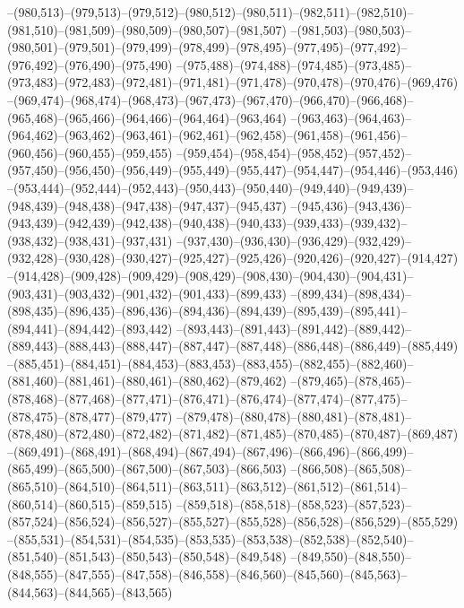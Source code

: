 --(980,513)--(979,513)--(979,512)--(980,512)--(980,511)--(982,511)--(982,510)--(981,510)--(981,509)--(980,509)--(980,507)--(981,507)
--(981,503)--(980,503)--(980,501)--(979,501)--(979,499)--(978,499)--(978,495)--(977,495)--(977,492)--(976,492)--(976,490)--(975,490)
--(975,488)--(974,488)--(974,485)--(973,485)--(973,483)--(972,483)--(972,481)--(971,481)--(971,478)--(970,478)--(970,476)--(969,476)
--(969,474)--(968,474)--(968,473)--(967,473)--(967,470)--(966,470)--(966,468)--(965,468)--(965,466)--(964,466)--(964,464)--(963,464)
--(963,463)--(964,463)--(964,462)--(963,462)--(963,461)--(962,461)--(962,458)--(961,458)--(961,456)--(960,456)--(960,455)--(959,455)
--(959,454)--(958,454)--(958,452)--(957,452)--(957,450)--(956,450)--(956,449)--(955,449)--(955,447)--(954,447)--(954,446)--(953,446)
--(953,444)--(952,444)--(952,443)--(950,443)--(950,440)--(949,440)--(949,439)--(948,439)--(948,438)--(947,438)--(947,437)--(945,437)
--(945,436)--(943,436)--(943,439)--(942,439)--(942,438)--(940,438)--(940,433)--(939,433)--(939,432)--(938,432)--(938,431)--(937,431)
--(937,430)--(936,430)--(936,429)--(932,429)--(932,428)--(930,428)--(930,427)--(925,427)--(925,426)--(920,426)--(920,427)--(914,427)
--(914,428)--(909,428)--(909,429)--(908,429)--(908,430)--(904,430)--(904,431)--(903,431)--(903,432)--(901,432)--(901,433)--(899,433)
--(899,434)--(898,434)--(898,435)--(896,435)--(896,436)--(894,436)--(894,439)--(895,439)--(895,441)--(894,441)--(894,442)--(893,442)
--(893,443)--(891,443)--(891,442)--(889,442)--(889,443)--(888,443)--(888,447)--(887,447)--(887,448)--(886,448)--(886,449)--(885,449)
--(885,451)--(884,451)--(884,453)--(883,453)--(883,455)--(882,455)--(882,460)--(881,460)--(881,461)--(880,461)--(880,462)--(879,462)
--(879,465)--(878,465)--(878,468)--(877,468)--(877,471)--(876,471)--(876,474)--(877,474)--(877,475)--(878,475)--(878,477)--(879,477)
--(879,478)--(880,478)--(880,481)--(878,481)--(878,480)--(872,480)--(872,482)--(871,482)--(871,485)--(870,485)--(870,487)--(869,487)
--(869,491)--(868,491)--(868,494)--(867,494)--(867,496)--(866,496)--(866,499)--(865,499)--(865,500)--(867,500)--(867,503)--(866,503)
--(866,508)--(865,508)--(865,510)--(864,510)--(864,511)--(863,511)--(863,512)--(861,512)--(861,514)--(860,514)--(860,515)--(859,515)
--(859,518)--(858,518)--(858,523)--(857,523)--(857,524)--(856,524)--(856,527)--(855,527)--(855,528)--(856,528)--(856,529)--(855,529)
--(855,531)--(854,531)--(854,535)--(853,535)--(853,538)--(852,538)--(852,540)--(851,540)--(851,543)--(850,543)--(850,548)--(849,548)
--(849,550)--(848,550)--(848,555)--(847,555)--(847,558)--(846,558)--(846,560)--(845,560)--(845,563)--(844,563)--(844,565)--(843,565)
